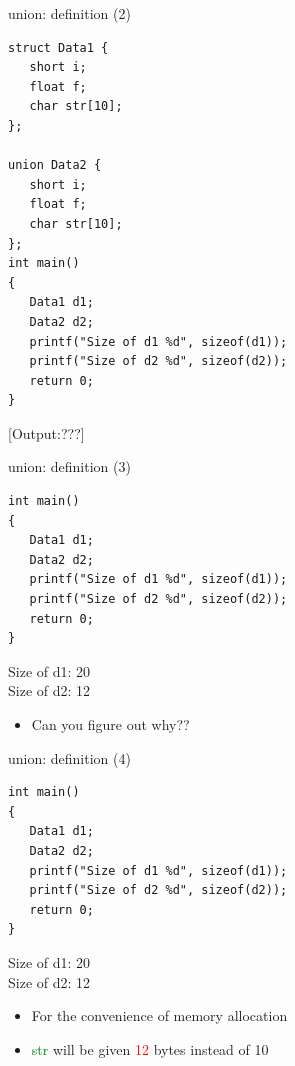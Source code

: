 \begin{frame}[fragile]{union: definition (2)}
\vspace{-0.2in}
\begin{lstlisting}
struct Data1 {
   short i;
   float f;
   char str[10];
};

union Data2 {
   short i;
   float f;
   char str[10];
};
int main()
{
   Data1 d1;
   Data2 d2;
   printf("Size of d1 %d", sizeof(d1));
   printf("Size of d2 %d", sizeof(d2));
   return 0;
}
\end{lstlisting}
\vspace{-0.15in}
[Output:???]
\end{frame}

\begin{frame}[fragile]{union: definition (3)}
\begin{lstlisting}
int main()
{
   Data1 d1;
   Data2 d2;
   printf("Size of d1 %d", sizeof(d1));
   printf("Size of d2 %d", sizeof(d2));
   return 0;
}
\end{lstlisting}
\begin{center}
Size of d1: 20 \\
Size of d2: 12
\end{center}
\begin{itemize}
	\item {Can you figure out why??}
\end{itemize}
\end{frame}

\begin{frame}[fragile]{union: definition (4)}
\begin{lstlisting}
int main()
{
   Data1 d1;
   Data2 d2;
   printf("Size of d1 %d", sizeof(d1));
   printf("Size of d2 %d", sizeof(d2));
   return 0;
}
\end{lstlisting}
\begin{center}
Size of d1: 20 \\
Size of d2: 12
\end{center}
\begin{itemize}
	\item {For the convenience of memory allocation}
	\item {\textcolor{green}{str} will be given \textcolor{red}{12} bytes instead of 10}
\end{itemize}
\end{frame}

